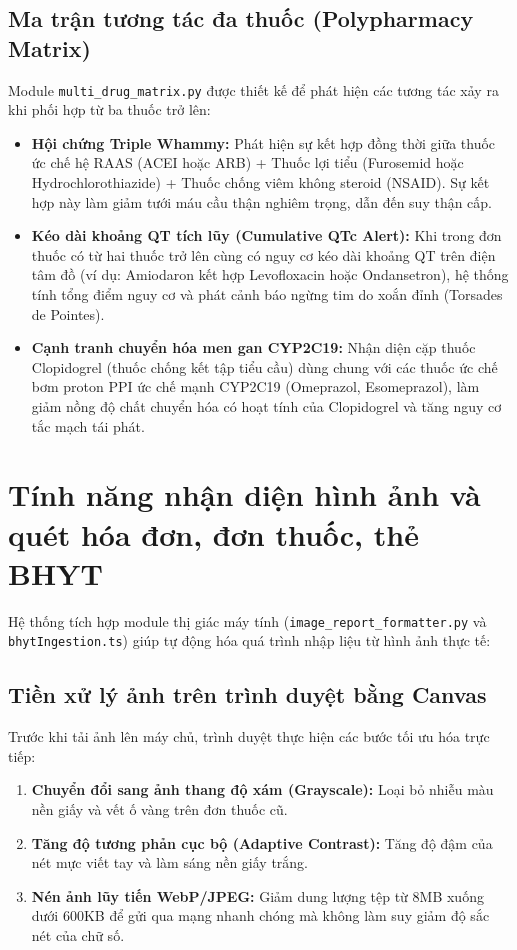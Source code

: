 \documentclass[12pt,a4paper]{article}
\begin{document}
\subsection{Ma trận tương tác đa thuốc (Polypharmacy Matrix)}
Module \texttt{multi\_drug\_matrix.py} được thiết kế để phát hiện các tương tác xảy ra khi phối hợp từ ba thuốc trở lên:
\begin{itemize}[leftmargin=1.5em]
    \item \textbf{Hội chứng Triple Whammy:} Phát hiện sự kết hợp đồng thời giữa thuốc ức chế hệ RAAS (ACEI hoặc ARB) + Thuốc lợi tiểu (Furosemid hoặc Hydrochlorothiazide) + Thuốc chống viêm không steroid (NSAID). Sự kết hợp này làm giảm tưới máu cầu thận nghiêm trọng, dẫn đến suy thận cấp.
    \item \textbf{Kéo dài khoảng QT tích lũy (Cumulative QTc Alert):} Khi trong đơn thuốc có từ hai thuốc trở lên cùng có nguy cơ kéo dài khoảng QT trên điện tâm đồ (ví dụ: Amiodaron kết hợp Levofloxacin hoặc Ondansetron), hệ thống tính tổng điểm nguy cơ và phát cảnh báo ngừng tim do xoắn đỉnh (Torsades de Pointes).
    \item \textbf{Cạnh tranh chuyển hóa men gan CYP2C19:} Nhận diện cặp thuốc Clopidogrel (thuốc chống kết tập tiểu cầu) dùng chung với các thuốc ức chế bơm proton PPI ức chế mạnh CYP2C19 (Omeprazol, Esomeprazol), làm giảm nồng độ chất chuyển hóa có hoạt tính của Clopidogrel và tăng nguy cơ tắc mạch tái phát.
\end{itemize}

\section{Tính năng nhận diện hình ảnh và quét hóa đơn, đơn thuốc, thẻ BHYT}

Hệ thống tích hợp module thị giác máy tính (\texttt{image\_report\_formatter.py} và \texttt{bhytIngestion.ts}) giúp tự động hóa quá trình nhập liệu từ hình ảnh thực tế:

\subsection{Tiền xử lý ảnh trên trình duyệt bằng Canvas}
Trước khi tải ảnh lên máy chủ, trình duyệt thực hiện các bước tối ưu hóa trực tiếp:
\begin{enumerate}[leftmargin=1.5em]
    \item \textbf{Chuyển đổi sang ảnh thang độ xám (Grayscale):} Loại bỏ nhiễu màu nền giấy và vết ố vàng trên đơn thuốc cũ.
    \item \textbf{Tăng độ tương phản cục bộ (Adaptive Contrast):} Tăng độ đậm của nét mực viết tay và làm sáng nền giấy trắng.
    \item \textbf{Nén ảnh lũy tiến WebP/JPEG:} Giảm dung lượng tệp từ 8MB xuống dưới 600KB để gửi qua mạng nhanh chóng mà không làm suy giảm độ sắc nét của chữ số.
\end{enumerate}
\end{document}
